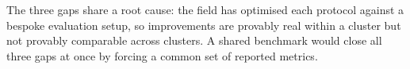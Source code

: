 \begin{keytakeaway}
The three gaps share a root cause: the field has optimised each protocol against a bespoke evaluation
setup, so improvements are provably real within a cluster but not provably comparable across clusters.
A shared benchmark would close all three gaps at once by forcing a common set of reported metrics.
\end{keytakeaway}
